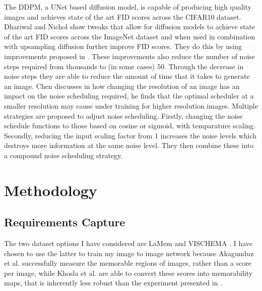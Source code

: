 \documentclass{UoYCSproject}
\begin{document}
The DDPM, a UNet based diffusion model,\cite{ho2020denoising} is capable of producing high quality images and achieves state of the art FID scores across the CIFAR10 dataset. Dhariwal and Nichol \cite{dhariwal2021diffusion} show tweaks that allow for diffusion models to achieve state of the art FID scores across the ImageNet dataset and when used in combination with upsampling diffusion further improve FID scores. They do this by using improvements proposed in \cite{song2022denoising, nichol2021improved, song2021scorebased, brock2019large, karras2019stylebased}. These improvements also reduce the number of noise steps required from thousands to (in some cases) 50. Through the decrease in noise steps they are able to reduce the amount of time that it takes to generate an image. Chen discusses in \cite{chen2023importance} how changing the resolution of an image has an impact on the noise scheduling required, he finds that the optimal scheduler at a smaller resolution may cause under training for higher resolution images. Multiple strategies are proposed to adjust noise scheduling. Firstly, changing the noise schedule functions to those based on cosine or sigmoid, with temparature scaling. Secondly, reducing the input scaling factor from 1 increases the noise levels which destroys more information at the same noise level. They then combine these into a compound noise scheduling strategy.


\chapter{Methodology}



\section{Requirements Capture}

The two dataset options I have considered are LaMem \cite{ICCV15_Khosla} and VISCHEMA \cite{VischemaPaper}. I have chosen to use the latter to train my image to image network because Akagunduz et al. successfully measure the memorable regions of images, rather than a score per image, while Khosla et al. are able to convert these scores into memorability maps, that is inherently less robust than the experiment presented in \cite{VischemaPaper}.
\end{document}
